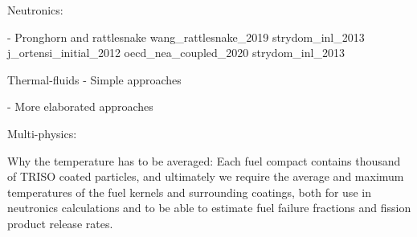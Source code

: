 Neutronics:

- Pronghorn and rattlesnake
wang_rattlesnake_2019
strydom_inl_2013
j_ortensi_initial_2012
oecd_nea_coupled_2020
strydom_inl_2013

Thermal-fluids
- Simple approaches

- More elaborated approaches


Multi-physics:






















Why the temperature has to be averaged:
Each fuel compact contains thousand of TRISO coated particles, and ultimately we require the average and maximum temperatures of the fuel kernels and surrounding coatings, both for use in neutronics calculations and to be able to estimate fuel failure fractions and fission product release rates.